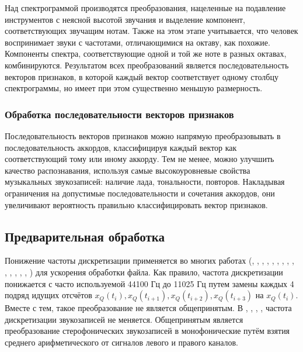 Над спектрограммой производятся преобразования, нацеленные на подавление
инструментов с неясной высотой звучания и выделение компонент, соответствующих
звучащим нотам. Также на этом этапе учитывается, что человек воспринимает звуки
с частотами, отличающимися на октаву, как похожие. Компоненты спектра,
соответствующие одной и той же ноте в разных октавах, комбинируются. Результатом
всех преобразований является последовательность векторов признаков, в которой
каждый вектор соответствует одному столбцу спектрограммы, но имеет при этом
существенно меньшую размерность.
  
\subsubsection{Обработка последовательности векторов признаков}
\label{sssectT_post}
Последовательность векторов признаков можно напрямую преобразовывать в
последовательность аккордов, классифицируя каждый вектор как соответствующий
тому или иному аккорду. Тем не менее, можно улучшить качество распознавания,
используя самые высокоуровневые свойства музыкальных звукозаписей: наличие лада,
тональности, повторов. Накладывая ограничения на допустимые последовательности и
сочетания аккордов, они увеличивают вероятность правильно классифицировать
вектор признаков.

\subsection{Предварительная обработка} \label{ssectT_prelim}

Понижение частоты дискретизации применяется во многих работах
(\cite{Sheh2003}, \cite{Bello2005}, \cite{Lee2006}, \cite{Burgoyne2007},
\cite{Lee2007}, \cite{Papadopoulos2007}, \cite{Mauch2008}, \cite{Khadkevich2009},
\cite{Mauch2009}, \cite{Oudre2009}, \cite{Reed2009}, \cite{Mauch2010},
\cite{Khadkevich2011}, \cite{Ni2011}, \cite{Humphrey2012}) для ускорения
обработки файла. Как правило, частота дискретизации понижается с часто
используемой 44100 Гц до 11025 Гц путем замены каждых 4 подряд идущих
отсчётов $x_Q(t_i), x_Q(t_{i+1}), x_Q(t_{i+2}), x_Q(t_{i+3})$ на $x_Q(t_i)$.
Вместе с тем, такое преобразование не является общепринятым. В \cite{Zhang2008},
\cite{Cho2010}, \cite{Rocher2010}, \cite{Cho2011}, \cite{DeHaas2012}  частота
дискретизации звукозаписей не меняется. Общепринятым является преобразование
стерофонических звукозаписей в монофонические путём взятия среднего
арифметического от сигналов левого и правого каналов.

